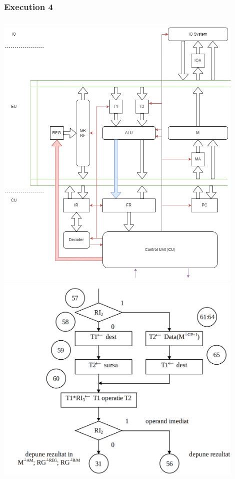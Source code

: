 \begin{frame}
    \frametitle{Execution 4}
    \begin{columns}
    \includegraphics[width=0.9\textwidth]{media/architecture.png}
    \includegraphics[width=0.9\textwidth]{media/cdtree4.png}
    \end{columns}
    \end{frame}




